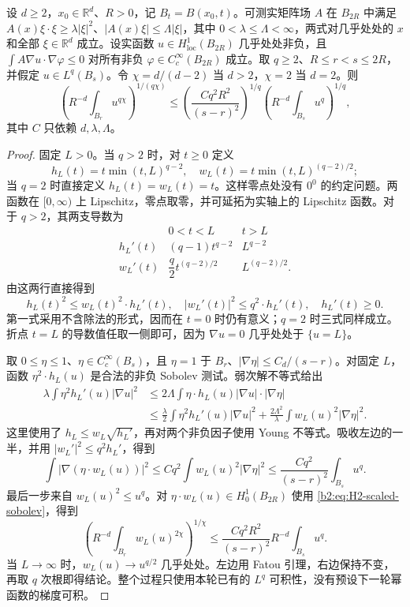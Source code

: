 \begin{lemma}[幂函数能量估计]
\label{b2:lem:H2-power-energy}
设 \(d\geq2\)，\(x_0\in\mathbb R^d\)、\(R>0\)，记 \(B_t=B(x_0,t)\)。可测实矩阵场 \(A\) 在 \(B_{2R}\) 中满足
\(A(x)\xi\cdot\xi\geq\lambda|\xi|^2\)、\(|A(x)\xi|\leq\Lambda|\xi|\)，其中 \(0<\lambda\leq\Lambda<\infty\)，两式对几乎处处的 \(x\) 和全部 \(\xi\in\mathbb R^d\) 成立。设实函数 \(u\in H^1_{\mathrm{loc}}(B_{2R})\) 几乎处处非负，且
\(\int A\nabla u\cdot\nabla\varphi\leq0\) 对所有非负 \(\varphi\in C_c^\infty(B_{2R})\) 成立。取 \(q\geq2\)、\(R\leq r<s\leq2R\)，并假定 \(u\in L^q(B_s)\)。令 \(\chi=d/(d-2)\) 当 \(d>2\)，\(\chi=2\) 当 \(d=2\)。则
\[
 \left(R^{-d}\int_{B_r}u^{q\chi}\right)^{1/(q\chi)}
 \leq
 \left(\frac{Cq^2R^2}{(s-r)^2}\right)^{1/q}
 \left(R^{-d}\int_{B_s}u^q\right)^{1/q},
\]
其中 \(C\) 只依赖 \(d,\lambda,\Lambda\)。
\end{lemma}
\begin{proof}
固定 \(L>0\)。当 \(q>2\) 时，对 \(t\geq0\) 定义
\[
 h_L(t)=t\min(t,L)^{q-2},
 \quad w_L(t)=t\min(t,L)^{(q-2)/2};
\]
当 \(q=2\) 时直接定义 \(h_L(t)=w_L(t)=t\)。这样零点处没有 \(0^0\) 的约定问题。两函数在 \([0,\infty)\) 上 Lipschitz，零点取零，并可延拓为实轴上的 Lipschitz 函数。对于 \(q>2\)，其两支导数为
\[
 \begin{array}{c|cc}
 &0<t<L&t>L\\ \hline
 h_L'(t)&(q-1)t^{q-2}&L^{q-2}\\
 w_L'(t)&\dfrac q2t^{(q-2)/2}&L^{(q-2)/2}.
 \end{array}
\]
由这两行直接得到
\[
 h_L(t)^2\leq w_L(t)^2\cdot h_L'(t),
 \quad |w_L'(t)|^2\leq q^2\cdot h_L'(t),
 \quad h_L'(t)\geq0.
\]
第一式采用不含除法的形式，因而在 \(t=0\) 时仍有意义；\(q=2\) 时三式同样成立。折点 \(t=L\) 的导数值任取一侧即可，因为 \(\nabla u=0\) 几乎处处于 \(\{u=L\}\)。

取 \(0\leq\eta\leq1\)、\(\eta\in C_c^\infty(B_s)\)，且 \(\eta=1\) 于 \(B_r\)、\(|\nabla\eta|\leq C_d/(s-r)\)。对固定 \(L\)，函数 \(\eta^2\cdot h_L(u)\) 是合法的非负 Sobolev 测试。弱次解不等式给出
\[
 \begin{aligned}
 \lambda\int\eta^2h_L'(u)|\nabla u|^2
 &\leq2\Lambda\int\eta\cdot h_L(u)
                        |\nabla u|\cdot|\nabla\eta|\\
 &\leq\frac\lambda2\int\eta^2h_L'(u)|\nabla u|^2
       +\frac{2\Lambda^2}{\lambda}
                    \int w_L(u)^2|\nabla\eta|^2.
 \end{aligned}
\]
这里使用了 \(h_L\leq w_L\sqrt{h_L'}\)，再对两个非负因子使用 Young 不等式。吸收左边的一半，并用 \(|w_L'|^2\leq q^2h_L'\)，得到
\[
 \int|\nabla(\eta\cdot w_L(u))|^2
 \leq Cq^2\int w_L(u)^2|\nabla\eta|^2
 \leq\frac{Cq^2}{(s-r)^2}\int_{B_s}u^q.
\]
最后一步来自 \(w_L(u)^2\leq u^q\)。对 \(\eta\cdot w_L(u)\in H_0^1(B_{2R})\) 使用 \eqref{b2:eq:H2-scaled-sobolev}，得到
\[
 \left(R^{-d}\int_{B_r}w_L(u)^{2\chi}\right)^{1/\chi}
 \leq\frac{Cq^2R^2}{(s-r)^2}
              R^{-d}\int_{B_s}u^q.
\]
当 \(L\to\infty\) 时，\(w_L(u)\to u^{q/2}\) 几乎处处。左边用 Fatou 引理，右边保持不变，再取 \(q\) 次根即得结论。整个过程只使用本轮已有的 \(L^q\) 可积性，没有预设下一轮幂函数的梯度可积。
\end{proof}

